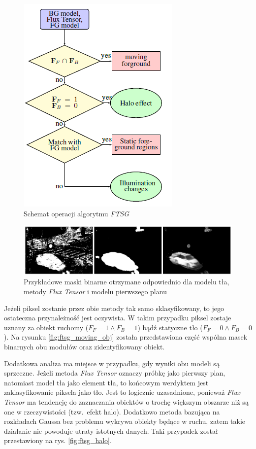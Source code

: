 \documentclass[10pt,a4paper]{article}
\begin{document}
		\begin{figure}[h]
				\centering
				\includegraphics[scale=0.8]{img/FTSG_flow.png}
				\caption{Schemat operacji algorytmu \textit{FTSG}}
				\label{fig:FTSG_flow}
		\end{figure}
		
		\begin{figure}[h]
				\centering
				\includegraphics[scale=0.65]{img/ftsg_models.png}
				\caption{Przykładowe maski binarne otrzymane odpowiednio dla modelu tła, metody \textit{Flux Tensor} i modelu pierwszego planu}
				\label{fig:ftsg_models}
		\end{figure}

Jeżeli piksel zostanie przez obie metody tak samo sklasyfikowany, to jego ostateczna przynależność jest oczywista. W takim przypadku piksel zostaje uznany za obiekt ruchomy ($F_F = 1 \land F_B = 1$) bądź statyczne tło ($F_F = 0 \land F_B = 0$). Na rysunku \ref{fig:ftsg_moving_obj} została przedstawiona część wspólna masek binarnych obu modułów oraz zidentyfikowany obiekt. 

Dodatkowa analiza ma miejsce w przypadku, gdy wyniki obu modeli są sprzeczne. Jeżeli metoda \textit{Flux Tensor} oznaczy próbkę jako pierwszy plan, natomiast model tła jako element tła, to końcowym werdyktem jest zaklasyfikowanie piksela jako tło. Jest to logicznie uzasadnione, ponieważ \textit{Flux Tensor} ma tendencję do zaznaczania obiektów o trochę większym obszarze niż są one w rzeczywistości (tzw.~efekt halo). Dodatkowo metoda bazująca na rozkładach Gaussa bez problemu wykrywa obiekty będące w ruchu, zatem takie działanie nie powoduje utraty istotnych danych. Taki przypadek został przestawiony na rys. \ref{fig:ftsg_halo}.
\end{document}
